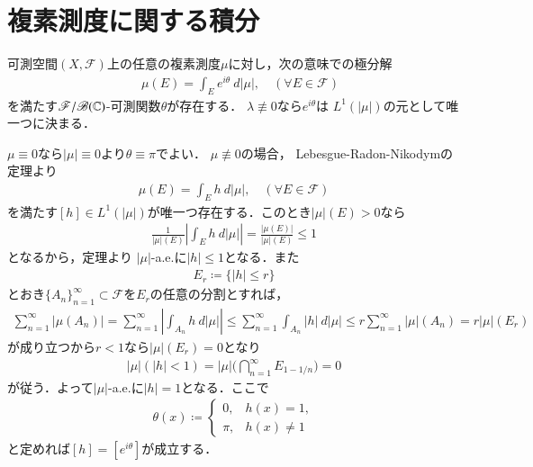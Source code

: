 \section{複素測度に関する積分}
	\begin{screen}
		\begin{thm}[複素測度の極分解]\label{thm:polar_decomposition_of_complex_measures}
			可測空間$(X,\mathscr{F})$上の任意の複素測度$\mu$に対し，次の意味での極分解
			\begin{align}
				\quad \mu(E) = \int_E e^{i\theta}\ d|\mu|,
				\quad (\forall E \in \mathscr{F})
			\end{align}
			を満たす$\mathscr{F}/\mathscr{B}(\mathbb{C})$-可測関数$\theta$が存在する．
			$\lambda \not\equiv 0$なら$e^{i \theta}$は
			$L^1(|\mu|)$の元として唯一つに決まる．
		\end{thm}
	\end{screen}
	
	\begin{prf} $\mu \equiv 0$なら$|\mu| \equiv 0$より$\theta \equiv \pi$でよい．
		$\mu \not\equiv 0$の場合，
		Lebesgue-Radon-Nikodymの定理より
		\begin{align}
			\mu(E) = \int_E h\ d|\mu|,
			\quad (\forall E \in \mathscr{F})
		\end{align}
		を満たす$[h] \in L^1(|\mu|)$が唯一つ存在する．このとき$|\mu|(E) > 0$なら
		\begin{align}
			\frac{1}{|\mu|(E)} \left| \int_E h\ d|\mu| \right|
			= \frac{|\mu(E)|}{|\mu|(E)} \leq 1
		\end{align}
		となるから，定理より
		$|\mu|$-a.e.に$|h| \leq 1$となる．また
		\begin{align}
			E_r \coloneqq \{|h| \leq r\}
		\end{align}
		とおき$\{A_n\}_{n=1}^\infty \subset \mathscr{F}$を$E_r$の任意の分割とすれば，
		\begin{align}
			\sum_{n=1}^\infty |\mu(A_n)|
			= \sum_{n=1}^\infty \left|\int_{A_n} h\ d|\mu|\right|
			\leq \sum_{n=1}^\infty \int_{A_n} |h|\ d|\mu|
			\leq r \sum_{n=1}^\infty |\mu|(A_n)
			= r |\mu|(E_r)
		\end{align}
		が成り立つから$r < 1$なら$|\mu|(E_r) = 0$となり
		\begin{align}
			|\mu|\left(|h|< 1 \right)
			= |\mu| \Biggl(\bigcap_{n=1}^\infty E_{1-1/n} \Biggr)
			= 0
		\end{align}
		が従う．よって$|\mu|$-a.e.に$|h|=1$となる．ここで
		\begin{align}
			\theta(x) \coloneqq
			\begin{cases}
				0, & h(x) = 1, \\
				\pi, & h(x) \neq 1
			\end{cases}
		\end{align}
		と定めれば$[h] = [e^{i \theta}]$が成立する．
		\QED
	\end{prf}
	
